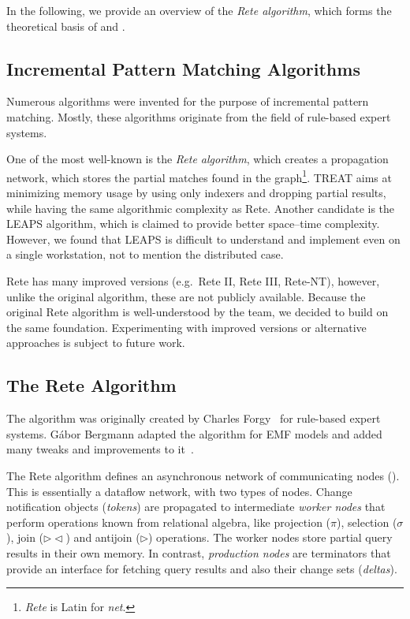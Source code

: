 In the following, we provide an overview of the \emph{Rete algorithm}, which forms the theoretical basis of \eiq{} and \iqd{}.

\subsection{Incremental Pattern Matching Algorithms}

Numerous algorithms were invented for the purpose of incremental pattern matching. Mostly, these algorithms originate from the field of rule-based expert systems.

One of the most well-known is the \emph{Rete algorithm}, which creates a propagation network, which stores the partial matches found in the graph\footnote{\emph{Rete} is Latin for \emph{net}.}. TREAT \cite{Miranker:1991:OPT:627280.627434} aims at minimizing memory usage by using only indexers and dropping partial results, while having the same algorithmic complexity as Rete. Another candidate is the LEAPS \cite{Batory:1994:LA:899216} algorithm, which is claimed to provide better space--time complexity. However, we found that LEAPS is difficult to understand and implement even on a single workstation, not to mention the distributed case. 

Rete has many improved versions (e.g.\ Rete II, Rete III, Rete-NT), however, unlike the original algorithm, these are not publicly available. Because the original Rete algorithm is well-understood by the \eiq{} team, we decided to build \iqd{} on the same foundation. Experimenting with improved versions or alternative approaches is subject to future work.

\subsection{The Rete Algorithm}
\label{rete}

The algorithm was originally created by Charles Forgy~\cite{Forgy} for rule-based expert systems. Gábor Bergmann  adapted the algorithm for EMF models and added many tweaks and improvements to it~\cite{BergmannMasters}.


The Rete algorithm defines an asynchronous network of communicating nodes (). This is essentially a dataflow network, with two types of nodes. Change notification objects (\emph{tokens}) are propagated to intermediate \emph{worker nodes} that perform operations known from relational algebra, like projection ($ \pi $), selection ($ \sigma $),  join ($ \rhd\!\!\lhd $) and antijoin ($ \rhd $) operations. The worker nodes store partial query results in their own memory. In contrast, \emph{production nodes} are terminators that provide an interface for fetching query results and also their change sets (\emph{deltas}).

